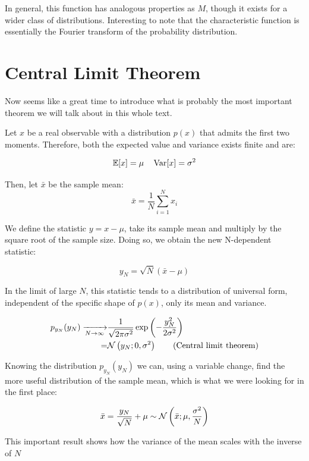 In general, this function has analogous properties as $M$, though it exists for a wider class of distributions. Interesting to note that the characteristic function is essentially the Fourier transform of the probability distribution. 

\section{Central Limit Theorem}
Now seems like a great time to introduce what is probably the most important theorem we will talk about in this whole text. 

\begin{theorem}\label{th:central_limit}
	Let $x$ be a real observable with a distribution $p(x)$ that admits the first two moments. Therefore, both the expected value and variance exists finite and are: 
	
	\[
	\mathbb{E}[x] = \mu \quad \operatorname{Var}[x] = \sigma^2
	\]
	
	Then, let $\bar{x}$ be the sample mean:
	\[
	\bar{x} = \frac{1}{N} \sum_{i=1}^{N} x_i
	\]
	
	We define the statistic $y = x - \mu$, take its sample mean and multiply by the square root of the sample size. Doing so, we obtain the new N-dependent statistic:
	
	\[
	y_N = \sqrt{N}\left(\bar{x}-\mu\right)
	\]
	
	In the limit of large $N$, this statistic tends to a distribution of universal form, independent of the specific shape of $p(x)$, only its mean and variance.
	
	\begin{align*}
		p_{y_N}(y_N) \xrightarrow[N\to\infty]{} &\frac{1}{\sqrt{2\pi\sigma^2}}\exp\left(-\frac{y_N^2}{2\sigma^2}\right) \\
		= &\mathcal{N}\left(y_N;0,\sigma^2\right)
		\label{eq:CLT}
		\tag{Central limit theorem}
	\end{align*}
\end{theorem}

\begin{corollary}
	Knowing the distribution $p_{y_N}(y_N)$ we can, using a variable change, find the more useful distribution of the sample mean, which is what we were looking for in the first place:
	
	\begin{equation}
		\bar{x} = \frac{y_N}{\sqrt{N}} + \mu \sim \mathcal{N}\left(\bar{x};\mu,\frac{\sigma^2}{N}\right)
	\end{equation}
	
	This important result shows how the variance of the mean scales with the inverse of $N$
\end{corollary}

